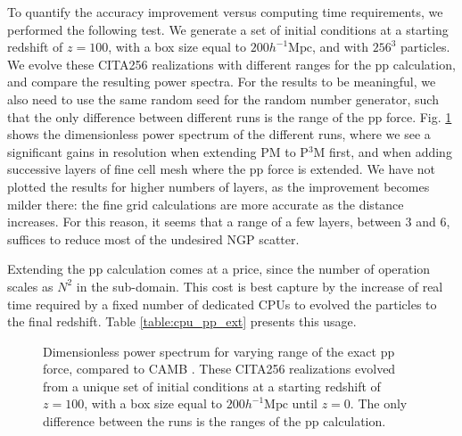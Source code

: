  
 
 To quantify the accuracy improvement versus computing time requirements, we performed the following test.
 We generate a set of initial conditions at a starting redshift of $z = 100$, with a box size equal to $ 200 h^{-1}\mbox{Mpc}$,
 and with $256^{3}$ particles. We evolve these CITA256 realizations with different ranges for the pp calculation, and compare 
 the resulting power spectra. For the results to be meaningful, we also need to use the same random seed for the random number generator,
 such that the only difference between different runs is the range of the pp force.
 Fig. \ref{fig:power} shows the dimensionless power spectrum of the different runs, where we see a significant gains in resolution
 when extending  PM to P$^{3}$M first, and when adding successive layers of fine cell mesh where the pp force is extended.
We have not plotted the results for higher numbers of layers, as the improvement becomes milder there: the fine grid calculations
are more accurate as the distance increases. For this reason, it seems that a range of a few layers, between 3 and 6, suffices 
to reduce most of the undesired NGP scatter.

Extending the pp calculation comes at a price, since the number of operation scales as  $N^{2}$ in the sub-domain. 
This cost is best capture by the increase of real time required by a fixed number of dedicated  {\small CPU}s 
to evolved the particles to the final redshift. Table \ref{table:cpu_pp_ext} presents this usage.

\begin{figure}
  \begin{center}
  \caption{ Dimensionless power spectrum for varying range of the exact pp force, compared to  {\small CAMB} \citep{Lewis:1999bs}.
  These CITA256 realizations evolved from a unique set of initial conditions at a starting redshift of $z = 100$, with a box size equal to $ 200 h^{-1}\mbox{Mpc}$ 
  until $z=0$. The only difference between the runs is the ranges of the pp calculation.}
    \label{fig:power}
  \end{center}
\end{figure}


